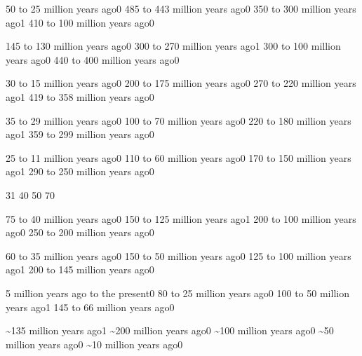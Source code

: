 {50 to 25 million years ago}{0}
{485 to 443 million years ago}{0}
{350 to 300 million years ago}{1}
{410 to 100 million years ago}{0}
\qstop

{145 to 130 million years ago}{0}
{300 to 270 million years ago}{1}
{300 to 100 million years ago}{0}
{440 to 400 million years ago}{0}
\qstop

{30 to 15 million years ago}{0}
{200 to 175 million years ago}{0}
{270 to 220 million years ago}{1}
{419 to 358 million years ago}{0}
\qstop

{35 to 29 million years ago}{0}
{100 to 70 million years ago}{0}
{220 to 180 million years ago}{1}
{359 to 299 million years ago}{0}
\qstop

{25 to 11 million years ago}{0}
{110 to 60 million years ago}{0}
{170 to 150 million years ago}{1}
{290 to 250 million years ago}{0}
\qstop

{3}{1}
{4}{0}
{5}{0}
{7}{0}
\qstop

{75 to 40 million years ago}{0}
{150 to 125 million years ago}{1}
{200 to 100 million years ago}{0}
{250 to 200 million years ago}{0}
\qstop

{60 to 35 million years ago}{0}
{150 to 50 million years ago}{0}
{125 to 100 million years ago}{1}
{200 to 145 million years ago}{0}
\qstop

{5 million years ago to the present}{0}
{80 to 25 million years ago}{0}
{100 to 50 million years ago}{1}
{145 to 66 million years ago}{0}
\qstop


{\textasciitilde 135 million years ago}{1}
{\textasciitilde 200 million years ago}{0}
{\textasciitilde 100 million years ago}{0}
{\textasciitilde 50 million years ago}{0}
{\textasciitilde 10 million years ago}{0}
\qstop

